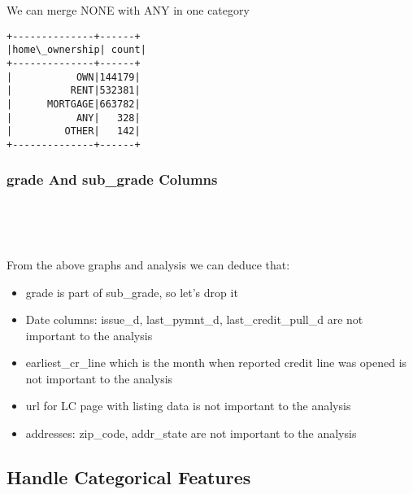 \documentclass[11pt]{article}
\begin{document}
    We can merge NONE with ANY in one category

    \begin{Verbatim}[commandchars=\\\{\}]
+--------------+------+
|home\_ownership| count|
+--------------+------+
|           OWN|144179|
|          RENT|532381|
|      MORTGAGE|663782|
|           ANY|   328|
|         OTHER|   142|
+--------------+------+

    \end{Verbatim}

    \hypertarget{grade-and-sub_grade-columns}{%
\subsubsection{grade And sub\_grade
Columns}\label{grade-and-sub_grade-columns}}

    \begin{center}
    \end{center}
    { \hspace*{\fill} \\}
    
    \begin{center}
    \end{center}
    { \hspace*{\fill} \\}
    
    From the above graphs and analysis we can deduce that:

\begin{itemize}
\item
  grade is part of sub\_grade, so let's drop it
\item
  Date columns: issue\_d, last\_pymnt\_d, last\_credit\_pull\_d are not
  important to the analysis
\item
  earliest\_cr\_line which is the month when reported credit line was
  opened is not important to the analysis
\item
  url for LC page with listing data is not important to the analysis
\item
  addresses: zip\_code, addr\_state are not important to the analysis
\end{itemize}

    \hypertarget{handle-categorical-features}{%
\subsection{Handle Categorical
Features}\label{handle-categorical-features}}
\end{document}
